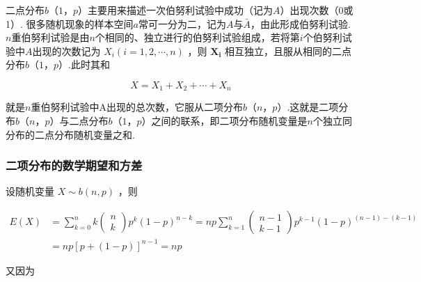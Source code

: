 二点分布$ b（1，p） $主要用来描述一次伯努利试验中成功（记为$ A $）出现次数（0或1）.
很多随机现象的样本空间$ a $常可一分为二，记为$ A $与$ \bar{A} $，由此形成伯努利试验.$ n $重伯努利试验是由$ n $个相同的、独立进行的伯努利试验组成，若将第$ i $个伯努利试验中$ A $出现的次数记为 $X_{i}(i=1,2, \cdots, n)$ ，则 $\boldsymbol{X}_{\mathbf{i}}$ 相互独立，且服从相同的二点分布$ b（1，p） $.此时其和

\[
X=X_{1}+X_{2}+\cdots+X_{n}
\]

就是$ n $重伯努利试验中A出现的总次数，它服从二项分布$ b（n，p） $.这就是二项分布$ b（n，p） $与二点分布$ b（1，p） $之间的联系，即二项分布随机变量是$ n $个独立同分布的二点分布随机变量之和.

\subsubsection{二项分布的数学期望和方差}

设随机变量 $X \sim b(n, p)$ ，则

\[
\begin{aligned} E(X) &=\sum_{k=0}^{n} k \left( \begin{array}{c}{n} \\ {k}\end{array}\right) p^{k}(1-p)^{n-k}=n p \sum_{k=1}^{n} \left( \begin{array}{c}{n-1} \\ {k-1}\end{array}\right) p^{k-1}(1-p)^{(n-1)-(k-1)} \\ &=n p[p+(1-p)]^{n-1}=n p \end{aligned}
\]

又因为

